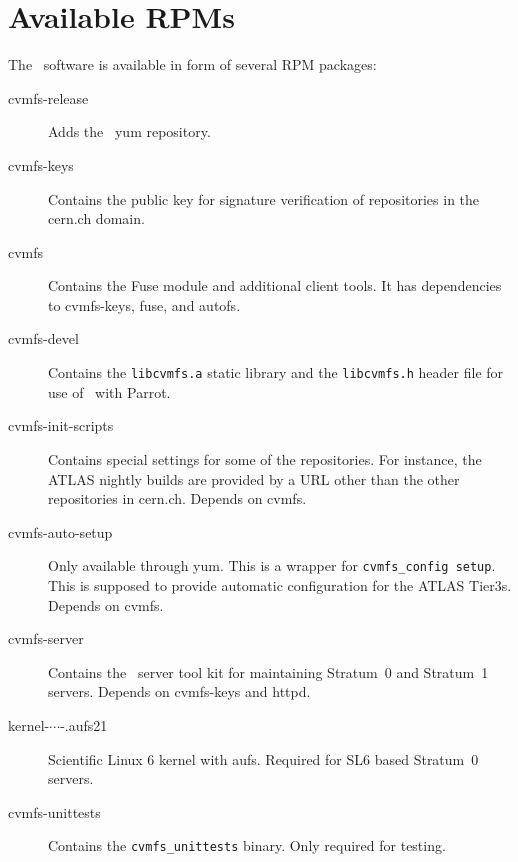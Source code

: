 \chapter{Available RPMs}
\label{apx:rpms}

The \cvmfs\ software is available in form of several RPM packages:
\begin{description}
	\item[cvmfs-release] Adds the \cvmfs\ yum repository.
	\item[cvmfs-keys] Contains the public key for signature verification of repositories in the cern.ch domain.
	\item[cvmfs] Contains the Fuse module and additional client tools.  It has dependencies to cvmfs-keys, fuse, and autofs.
	\item[cvmfs-devel] Contains the \texttt{libcvmfs.a} static library and the \texttt{libcvmfs.h} header file for use of \cvmfs\ with Parrot\cite{parrot05}.
	\item[cvmfs-init-scripts] Contains special settings for some of the repositories.
		For instance, the ATLAS nightly builds are provided by a URL other than the other repositories in cern.ch.
		Depends on cvmfs.
	\item[cvmfs-auto-setup] Only available through yum. 
		This is a wrapper for \texttt{cvmfs\_config setup}. 
		This is supposed to provide automatic configuration for the ATLAS Tier3s.
		Depends on cvmfs.
	\item[cvmfs-server] Contains the \cvmfs\ server tool kit for maintaining Stratum~0 and Stratum~1 servers.
		Depends on cvmfs-keys and httpd.
	\item[kernel-$\cdots$-.aufs21] Scientific Linux 6 kernel with aufs.
		Required for SL6 based Stratum~0 servers.
	\item[cvmfs-unittests] Contains the \texttt{cvmfs\_unittests} binary.  Only required for testing.
\end{description}
